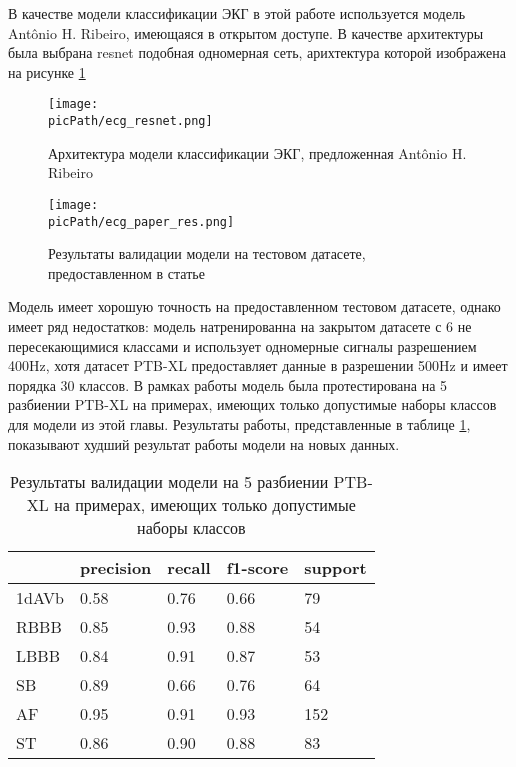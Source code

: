 \documentclass[oneside,final,14pt]{extreport}
\newcommand{\picPath}{img}
\begin{document}
В качестве модели классификации ЭКГ в этой работе используется модель Antônio H. Ribeiro\cite{bib:alberto}, имеющаяся в открытом доступе. В качестве архитектуры была выбрана resnet  подобная одномерная сеть, арихтектура которой изображена на рисунке 
\ref{pic:ecg_resnet}



\begin{figure}[H]
\begin{center}
\texttt{[image: \\picPath/ecg\_resnet.png]}
\end{center}
  \caption{Архитектура модели классификации ЭКГ, предложенная  Antônio H. Ribeiro}
  \label{pic:ecg_resnet}
\end{figure}

\begin{figure}[H]
\begin{center}
\texttt{[image: \\picPath/ecg\_paper\_res.png]}
\end{center}
  \caption{Результаты валидации модели на тестовом датасете, предоставленном в статье}
  \label{pic:ecg_paper_res}
\end{figure}

Модель имеет хорошую точность на предоставленном тестовом датасете, однако имеет ряд недостатков: модель натренированна на закрытом датасете с 6 не пересекающимися классами и использует одномерные сигналы разрешением 400Hz, хотя датасет  PTB-XL предоставляет данные в разрешении 500Hz и имеет порядка 30 классов. В рамках работы модель была протестирована на 5 разбиении PTB-XL на примерах, имеющих только допустимые наборы классов для модели из этой главы. Результаты работы, представленные в таблице \ref{tab:ecg_results}, показывают худший результат работы модели на новых данных.
\begin{table}[H]
\caption{Результаты валидации модели на  5 разбиении PTB-XL на примерах, имеющих только допустимые наборы классов}

\label{tab:ecg_results}
\begin{tabularx}{\textwidth}{|X|X|X|X|X|} %
\hline 
&precision & recall &  f1-score  &support \\ \hline
1dAVb   &    0.58   &   0.76  &    0.66  &      79 \\ \hline 
    RBBB   &     0.85   &    0.93   &    0.88  &       54 \\ \hline 
    LBBB   &    0.84   &   0.91   &   0.87   &     53 \\ \hline
      SB  &     0.89   &   0.66  &    0.76  &      64 \\ \hline
      AF    &   0.95  &    0.91  &    0.93   &    152 \\ \hline
      ST  &     0.86  &    0.90   &   0.88   & 83   \\ \hline
\end{tabularx}
\end{table}
\end{document}
